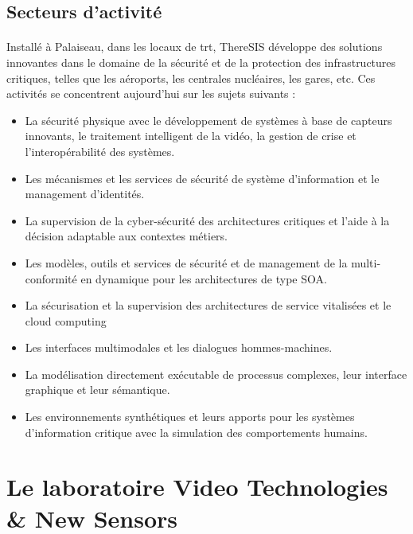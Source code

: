 \subsection{Secteurs d’activit\'e}

\paragraph{} Install\'e à Palaiseau, dans les locaux de \gls{trt}, ThereSIS d\'eveloppe des solutions innovantes dans le domaine de la s\'ecurit\'e et de la protection des infrastructures critiques, telles que les a\'eroports, les centrales nucl\'eaires, les gares, etc. Ces activit\'es se concentrent aujourd’hui sur les sujets suivants :

\begin{itemize}
  \item La s\'ecurit\'e physique avec le d\'eveloppement de systèmes \`a base de capteurs innovants, le traitement intelligent de la vid\'eo, la gestion de crise et l’interop\'erabilit\'e des systèmes.
  \item Les m\'ecanismes et les services de s\'ecurit\'e de système d’information et le management d’identit\'es.
  \item La supervision de la cyber-s\'ecurit\'e des architectures critiques et l’aide à la d\'ecision adaptable aux contextes m\'etiers.
  \item Les modèles, outils et services de s\'ecurit\'e et de management de la multi-conformit\'e en dynamique pour les architectures de type SOA.
  \item La s\'ecurisation et la supervision des architectures de service vitalis\'ees et le \flqq cloud computing\frqq
  \item Les interfaces multimodales et les dialogues hommes-machines.
  \item La mod\'elisation directement ex\'ecutable de processus complexes, leur interface graphique et leur s\'emantique.
  \item Les environnements synth\'etiques et leurs apports pour les systèmes d’information critique avec la simulation des comportements humains.
\end{itemize}



\section{Le laboratoire Video Technologies \& New Sensors}

